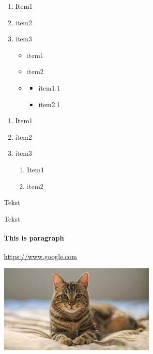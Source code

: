\documentclass{report}
\begin{document}
    \begin{enumerate}
        \item Item1
        \item item2 
        \item item3 
            \begin{itemize}
                \item item1
                \item item2
                \item \begin{itemize}
                        \item item1.1
                        \item item2.1
                    \end{itemize}
            \end{itemize}
    \end{enumerate}
    \begin{enumerate}
        \item Item1
        \item item2
        \item item3 \begin{enumerate}
                \item Item1
                \item item2
            \end{enumerate}
    \end{enumerate}

    Tekst    

    Tekst



    
    \paragraph{This is paragraph}
    \url{https://www.google.com}

    \includegraphics{../cat.jpg}
\end{document}
